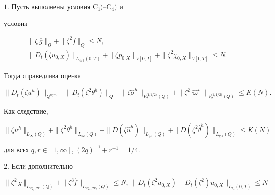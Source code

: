 \begin{thms} $1.$ Пусть выполнены условия $\mathrm C_1)$--$\mathrm C_4)$ и


условия


\begin{gather}


\|\zeta\, \overline g\|_Q+\|\zeta^2\overline f\|_Q \le N,\\


\|D_t(\zeta u_{0,X})\|_{L_{4/3}(0,T)}+\|\zeta p_{0,X}\|_{V[0,T]}


+\|\zeta^2\chi_{0,X}\|_{V[0,T]}\le N.


\end{gather}


Тогда справедлива оценка


\begin{equation}


\|D_t(\zeta u^h)\|_{Q^{h;m}}+\|D_t(\zeta^2\theta^h)\|_{Q}+


\|\zeta\widehat\sigma^h\|_{V_2^{\langle1,1/2\rangle}(Q)}+


\|\zeta^2\widehat\varpi^h\|_{V_2^{\langle1,1/2\rangle}(Q)} \le K(N).


\end{equation}


Как следствие,


\begin{equation}


\|\zeta u^h\|_{L_\infty(Q)}+\|\zeta^2\theta^h\|_{L_\infty(Q)}+


\|D(\zeta \widehat u^h)\|_{L_{q,r}(Q)}+


\|D(\zeta^2\widehat\theta^h)\|_{L_{q,r}(Q)}\le K(N)


\end{equation}


для всех $q,r\in [1,\infty]$, $(2q)^{-1}+r^{-1}=1/4$.








$2.$ Если дополнительно


\begin{equation}


\|\zeta^2\,\overline g\|_{L_{2q_1,2r_1}(Q)}+


\|\zeta^3\overline f\|_{L_{2q_2,2r_2}(Q)}\le N,\


\|D_t(\zeta^2u_{0,X})-D_t(\zeta^2)u_{0,X}\|_{L_{r_\varepsilon}(0,T)}\le N


\end{equation}



\end{thms}

